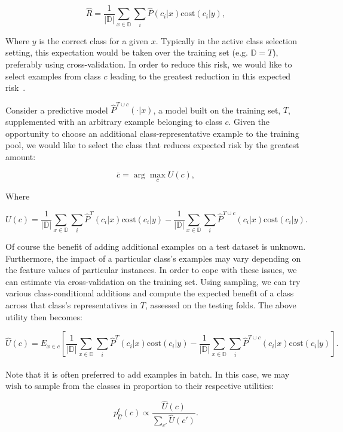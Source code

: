 $$ \hat{R} = \frac{1}{|\mathbb{D}|} \sum_{x \in \mathbb{D}} \sum_i \hat{P}(c_i | x)\mbox{cost}(c_i | y),$$


\noindent Where $y$ is the correct class for a given $x$. Typically in the active class selection setting, this expectation would be taken over the training set (e.g. $\mathbb{D} = T$), preferably using cross-validation. In order to reduce this risk, we would like to select examples from class $c$ leading to the greatest reduction in this expected risk~\cite{lomaskyThesis}.

Consider a predictive model $\hat{P}^{T \cup c}(\cdot | x)$, a model built on the training set, $T$, supplemented with an arbitrary example belonging to class $c$. Given the opportunity to choose an additional class-representative example to the training pool, we would like to select the class that reduces expected risk by the greatest amount:

$$ \bar{c} = \arg \max_c U(c),$$

\noindent Where

$$ U(c) = \frac{1}{|\mathbb{D}|} \sum_{x \in \mathbb{D}} \sum_i \hat{P}^T(c_i | x)\mbox{cost}(c_i | y) - \frac{1}{|\mathbb{D}|} \sum_{x \in \mathbb{D}} \sum_i \hat{P}^{T \cup c}(c_i | x)\mbox{cost}(c_i | y).  $$

Of course the benefit of adding additional examples on a test dataset is unknown. Furthermore, the impact of a particular class's examples may vary depending on the feature values of particular instances. In order to cope with these issues, we can estimate via cross-validation on the training set. Using sampling, we can try various class-conditional additions and compute the expected benefit of a class across that class's representatives in $T$, assessed on the testing folds. The above utility then becomes:

$$\hat{U}(c) = E_{x \in c} \left[ \frac{1}{|\mathbb{D}|} \sum_{x \in \mathbb{D}} \sum_i \hat{P}^T(c_i | x)\mbox{cost}(c_i | y) - \frac{1}{|\mathbb{D}|} \sum_{x \in \mathbb{D}} \sum_i \hat{P}^{T \cup c}(c_i | x)\mbox{cost}(c_i | y)  \right]. $$\\


Note that it is often preferred to add examples in batch. In this case, we may wish to sample from the classes in proportion to their respective utilities:

$$ p^t_{\hat{U}}(c) \propto \frac{\hat{U}(c)}{\sum_{c'} \hat{U}(c')}. $$

